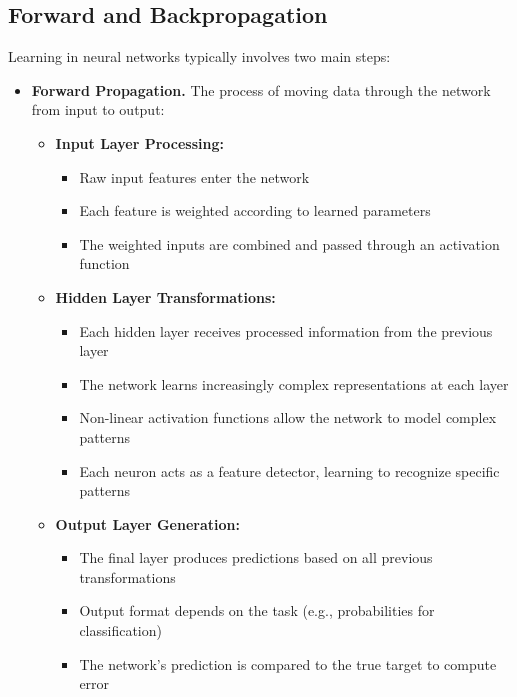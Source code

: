 \subsection{Forward and Backpropagation}
\noindent
Learning in neural networks typically involves two main steps:
\begin{itemize}
    \item \textbf{Forward Propagation.} The process of moving data through the network from input to output:
    
    \begin{itemize}
        \item \textbf{Input Layer Processing:}
            \begin{itemize}
                \item Raw input features enter the network
                \item Each feature is weighted according to learned parameters
                \item The weighted inputs are combined and passed through an activation function
            \end{itemize}
            
        \item \textbf{Hidden Layer Transformations:}
            \begin{itemize}
                \item Each hidden layer receives processed information from the previous layer
                \item The network learns increasingly complex representations at each layer
                \item Non-linear activation functions allow the network to model complex patterns
                \item Each neuron acts as a feature detector, learning to recognize specific patterns
            \end{itemize}
            
        \item \textbf{Output Layer Generation:}
            \begin{itemize}
                \item The final layer produces predictions based on all previous transformations
                \item Output format depends on the task (e.g., probabilities for classification)
                \item The network's prediction is compared to the true target to compute error
            \end{itemize}
            

\end{itemize}
\end{itemize}
